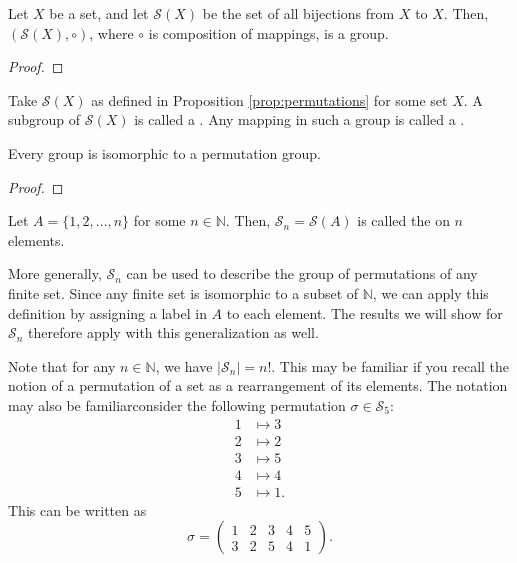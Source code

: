\begin{prop}\label{prop:permutations}
Let $ X $ be a set, and let $ \mathcal{S}(X) $ be the set of all bijections from $ X $ to $ X $. Then, $ (\mathcal{S}(X),\circ) $, where $ \circ $ is composition of mappings, is a group.
\end{prop}
\begin{proof}
\end{proof}

\begin{defn}
Take $ \mathcal{S}(X) $ as defined in Proposition \ref{prop:permutations} for some set $ X $. A subgroup of $ \mathcal{S}(X) $ is called a . Any mapping in such a group is called a .
\end{defn}

\begin{thm}
Every group is isomorphic to a permutation group.
\end{thm}
\begin{proof}
\end{proof}

\begin{defn}\label{defn:symmetric_group}
Let $ A=\{1,2,\ldots,n\} $ for some $ n\in\mathbb{N} $. Then, $ \mathcal{S}_n=\mathcal{S}(A) $ is called the  on $ n $ elements.
\end{defn}

More generally, $ \mathcal{S}_n $ can be used to describe the group of permutations of any finite set. Since any finite set is isomorphic to a subset of $ \mathbb{N} $, we can apply this definition by assigning a label in $ A $ to each element. The results we will show for $ \mathcal{S}_n $ therefore apply with this generalization as well.

Note that for any $ n\in\mathbb{N} $, we have $ \lvert\mathcal{S}_n\rvert=n! $. This may be familiar if you recall the notion of a permutation of a set as a rearrangement of its elements. The notation may also be familiar\textemdash consider the following permutation $ \sigma\in\mathcal{S}_5 $:
\begin{align*}
    1 &\mapsto 3 \\
    2 &\mapsto 2 \\
    3 &\mapsto 5 \\
    4 &\mapsto 4 \\
    5 &\mapsto 1.
\end{align*}
This can be written as
\begin{equation*}
    \sigma=
    \begin{pmatrix}
        1 & 2 & 3 & 4 & 5 \\
        3 & 2 & 5 & 4 & 1
    \end{pmatrix}.
\end{equation*}

